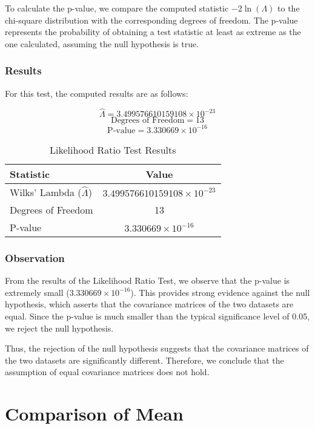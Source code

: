 \documentclass[11pt]{article}
\begin{document}
To calculate the p-value, we compare the computed statistic \( -2 \ln(\Lambda) \) to the chi-square distribution with the corresponding degrees of freedom. The p-value represents the probability of obtaining a test statistic at least as extreme as the one calculated, assuming the null hypothesis is true.

\subsubsection{Results}

For this test, the computed results are as follows:

\[
\hat{\Lambda} = 3.499576610159108 \times 10^{-23}
\]
\[
\text{Degrees of Freedom} = 13
\]
\[
\text{P-value} = 3.330669 \times 10^{-16}
\]

\begin{table}[H]
\centering
\begin{tabular}{|l|c|}
    \hline
    \textbf{Statistic} & \textbf{Value} \\
    \hline
    Wilks' Lambda (\(\hat{\Lambda}\)) & \( 3.499576610159108 \times 10^{-23} \) \\
    \hline
    Degrees of Freedom & 13 \\
    \hline
    P-value & \( 3.330669 \times 10^{-16} \) \\
    \hline
\end{tabular}
\caption{Likelihood Ratio Test Results}
\end{table}

\subsubsection{Observation}

From the results of the Likelihood Ratio Test, we observe that the p-value is extremely small (\( 3.330669 \times 10^{-16} \)). This provides strong evidence against the null hypothesis, which asserts that the covariance matrices of the two datasets are equal. Since the p-value is much smaller than the typical significance level of 0.05, we reject the null hypothesis.

Thus, the rejection of the null hypothesis suggests that the covariance matrices of the two datasets are significantly different. Therefore, we conclude that the assumption of equal covariance matrices does not hold.

\section{Comparison of Mean}
\end{document}
